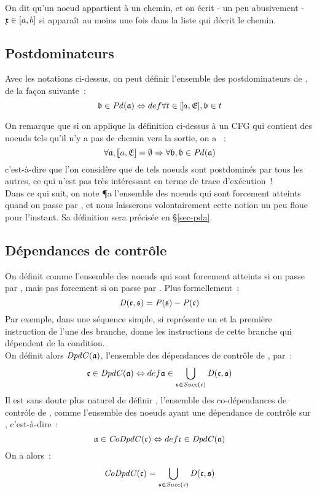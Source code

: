 On dit qu'un noeud appartient à un chemin, et on écrit - un peu abusivement -
$\mathfrak{x} \in [a, b]$ si  apparaît au moins une fois
dans la liste qui décrit le chemin.

\subsection{Postdominateurs}

Avec les notations ci-dessus,
on peut définir  l'ensemble des postdominateurs de ,
de la façon suivante~:
$$
  \mathfrak{b} \in \mathit{Pd}(\mathfrak{a}) \Leftrightarrow{def} \forall t \in \llbracket a, \mathfrak{E}], \mathfrak{b} \in t
$$

On remarque que si on applique la définition ci-dessus à un CFG
qui contient des noeuds tels qu'il n'y a pas de chemin vers la sortie,
on a ~:
$$
\forall \mathfrak{a}, \llbracket a, \mathfrak{E}] = \emptyset \Rightarrow \forall \mathfrak{b}, \mathfrak{b} \in \mathit{Pd}(\mathfrak{a})
$$
c'est-à-dire que l'on considère que de tels noeuds sont postdominés par tous les
autres, ce qui n'est pas très intéressant en terme de trace d'exécution~!\\

Dans ce qui suit, on note \P{a} l'ensemble des noeuds qui sont forcement
atteints quand on passe par ,
et nous laisserons volontairement cette notion
un peu floue pour l'instant. Sa définition sera précisée en \S\ref{sec-pda}.

\subsection{Dépendances de contrôle} \label{sec-dpdc-if}

On définit  comme
l'ensemble des noeuds qui sont forcement atteints si on passe par
, mais pas forcement si on passe par .
Plus formellement~:
$$
\mathit{D}(\mathfrak{c},\mathfrak{s}) = \mathit{P}(\mathfrak{s}) - \mathit{P}(\mathfrak{c})
$$
Par exemple, dans une séquence simple, si  représente un
 et  la première instruction de l'une des branche, 
donne les instructions de cette branche qui dépendent de la condition.\\

On définit alors $\mathit{DpdC}(\mathfrak{a})$,
l'ensemble des dépendances de contrôle de , par~:
$$
\mathfrak{c} \in \mathit{DpdC}(\mathfrak{a}) \Leftrightarrow{def} \mathfrak{a} \in \bigcup_{ \mathfrak{s} \in \mathit{Succ}(\mathfrak{c})} \mathit{D}(\mathfrak{c},\mathfrak{s})
$$
Il est sans doute plus naturel de définir ,
l'ensemble des co-dépendances de contrôle de ,
comme l'ensemble des noeuds ayant une dépendance de contrôle sur ,
c'est-à-dire~:
$$
  \mathfrak{a} \in \mathit{CoDpdC}(\mathfrak{c}) \Leftrightarrow{def} \mathfrak{c} \in \mathit{DpdC}(\mathfrak{a})
$$
On a alors~:
$$
\mathit{CoDpdC}(\mathfrak{c}) = \bigcup_{ \mathfrak{s} \in \mathit{Succ}(\mathfrak{c})}  \mathit{D}(\mathfrak{c},\mathfrak{s})
$$



